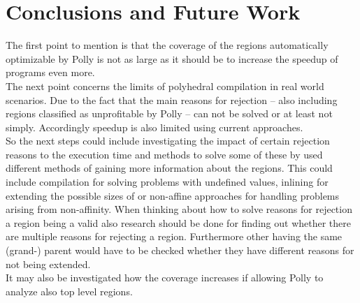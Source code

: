 \chapter{Conclusions and Future Work}
The first point to mention is that the coverage of the regions automatically optimizable by Polly is not as large as it should be to increase the speedup of programs even more.\\
The next point concerns the limits of polyhedral compilation in real world scenarios.
Due to the fact that the main reasons for rejection -- also including regions classified as unprofitable by Polly -- can not be solved or at least not simply.
Accordingly speedup is also limited using current approaches.\\
So the next steps could include investigating the impact of certain rejection reasons to the execution time and methods to solve some of these by used different methods of gaining more information about the regions.
This could include \jit compilation for solving problems with undefined values, inlining for extending the possible sizes of \scops or non-affine approaches for handling problems arising from non-affinity.
When thinking about how to solve reasons for rejection a region being a valid \scop also research should be done for finding out whether there are multiple reasons for rejecting a region.
Furthermore other \scops having the same (grand-) parent would have to be checked whether they have different reasons for not being extended.\\
It may also be investigated how the coverage increases if allowing Polly to analyze also top level regions.

